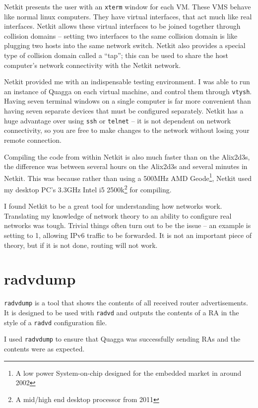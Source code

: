 \documentclass[12pt,a4paper,twoside]{report}
\begin{document}
Netkit presents the user with an \texttt{xterm} window for each VM\@. These VMS
behave like normal linux computers. They have virtual interfaces, that act much
like real interfaces. Netkit allows these virtual interfaces to be joined
together through collision domains -- setting two interfaces to the same
collision domain is like plugging two hosts into the same network switch.
Netkit also provides a special type of collision domain called a ``tap''; this
can be used to share the host computer's network connectivity with the Netkit
network.

Netkit provided me with an indispensable testing environment. I was able to run
an instance of Quagga on each virtual machine, and control them through
\texttt{vtysh}. Having seven terminal windows on a single computer is far more
convenient than having seven separate devices that must be configured
separately. Netkit has a huge advantage over using \texttt{ssh} or
\texttt{telnet} -- it is not dependent on network connectivity, so you are free
to make changes to the network without losing your remote connection.

Compiling the code from within Netkit is also much faster than on the Alix2d3s,
the difference was between several hours on the Alix2d3s and several minutes in
Netkit. This was because rather than using a 500MHz AMD Geode\footnote{A low
power System-on-chip designed for the embedded market in around 2002}, Netkit
used my desktop PC's 3.3GHz Intel i5 2500k\footnote{A mid/high end desktop
processor from 2011} for compiling. 

I found Netkit to be a great tool for understanding how networks work.
Translating my knowledge of network theory to an ability to configure real
networks was tough. Trivial things often turn out to be the issue -- an example
is setting  to 1, allowing IPv6
traffic to be forwarded. It is not an important piece of theory, but if it is
not done, routing will not work. 

\section{radvdump}
\texttt{radvdump} is a tool that shows the contents of all received router
advertisements. It is designed to be used with \texttt{radvd} and outputs the
contents of a RA in the style of a \texttt{radvd} configuration file. 

I used \texttt{radvdump} to ensure that Quagga was successfully sending RAs and
the contents were as expected. 
\end{document}
